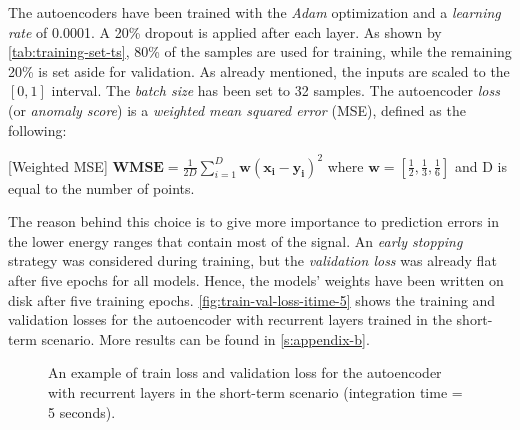 The autoencoders have been trained with the \textit{Adam} optimization \cite{Kingma_2014} and a \textit{learning rate} of 0.0001. A 20\% dropout is applied after each layer. As shown by \autoref{tab:training-set-ts}, 80\% of the samples are used for training, while the remaining 20\% is set aside for validation. As already mentioned, the inputs are scaled to the $[0, 1]$ interval. The \textit{batch size} has been set to 32 samples. The autoencoder \textit{loss} (or \textit{anomaly score}) is a \textit{weighted mean squared error} (MSE), defined as the following:
\begin{definition} \label{def:wmse}
[Weighted MSE] $\textbf{WMSE}=\frac{1}{2D}\sum_{i=1}^{D}\bm{w}(\bm{x_i}-\bm{y_i})^2$ where $\bm{w}=[\frac{1}{2}, \frac{1}{3}, \frac{1}{6}]$ and D is equal to the number of points. 
\end{definition}
The reason behind this choice is to give more importance to prediction errors in the lower energy ranges that contain most of the signal. An \textit{early stopping} strategy was considered during training, but the \textit{validation loss} was already flat after five epochs for all models. Hence, the models' weights have been written on disk after five training epochs. \autoref{fig:train-val-loss-itime-5} shows the training and validation losses for the autoencoder with recurrent layers trained in the short-term scenario. More results can be found in \autoref{s:appendix-b}.
\begin{figure}[t]
    \centering
    \begin{minipage}{1\textwidth}
       \centering
        
    \end{minipage}
    \caption{An example of train loss and validation loss for the autoencoder with recurrent layers in the short-term scenario (integration time = 5 seconds).}
    \label{fig:train-val-loss-itime-5}
\end{figure}
 



